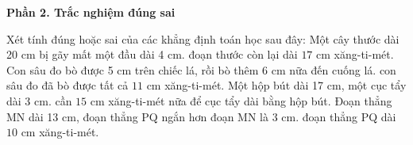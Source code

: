 \textbf{Phần 2. Trắc nghiệm đúng sai}

\begin{ex} %
Xét tính đúng hoặc sai của các khẳng định toán học sau đây:
\choiceTF
{Một cây thước dài 20 cm bị gãy mất một đầu dài 4 cm. đoạn thước còn lại dài $17\text{ cm}$ xăng-ti-mét.}
{\True Con sâu đo bò được 5 cm trên chiếc lá, rồi bò thêm 6 cm nữa đến cuống lá. con sâu đo đã bò được tất cả $11\text{ cm}$ xăng-ti-mét.}
{Một hộp bút dài 17 cm, một cục tẩy dài 3 cm. cần $15\text{ cm}$ xăng-ti-mét nữa để cục tẩy dài bằng hộp bút.}
{\True Đoạn thẳng MN dài 13 cm, đoạn thẳng PQ ngắn hơn đoạn MN là 3 cm. đoạn thẳng PQ dài $10\text{ cm}$ xăng-ti-mét.}
\end{ex}


